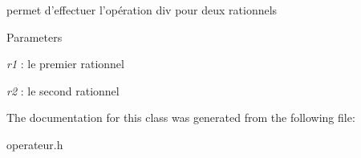 permet d'effectuer l'opération div pour deux rationnels 


\begin{DoxyParams}{Parameters}
\item[{\em r1}]: le premier rationnel \item[{\em r2}]: le second rationnel \end{DoxyParams}


The documentation for this class was generated from the following file:\begin{DoxyCompactItemize}
\item 
operateur.h\end{DoxyCompactItemize}
